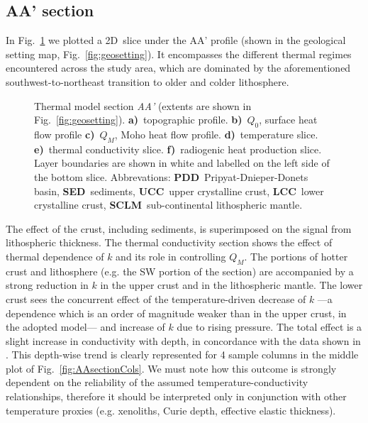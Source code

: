 {\subsection{AA' section}
\label{ss:Appl:DiscTherm:Section}

In Fig.~\ref{fig:AAsection} we plotted a 2D~slice under the AA' profile (shown in the geological setting map, Fig.~\ref{fig:geosetting}).
It encompasses the different thermal regimes encountered across the study area, which are dominated by the aforementioned southwest-to-northeast transition to older and colder lithosphere.

\begin{figure}
	\begin{adjustbox}{center}
	\end{adjustbox}
	\caption{Thermal model section \textit{AA'} (extents are shown in Fig.~\ref{fig:geosetting}).
	\textbf{a)}~topographic profile.
	\textbf{b)}~$Q_0$, surface heat flow profile
	\textbf{c)}~$Q_M$, Moho heat flow profile.
	\textbf{d)}~temperature slice.
	\textbf{e)}~thermal conductivity slice.
	\textbf{f)}~radiogenic heat production slice.
	Layer boundaries are shown in white and labelled on the left side of the bottom slice.
	Abbrevations: \textbf{PDD}~Pripyat-Dnieper-Donets basin, \textbf{SED}~sediments, \textbf{UCC}~upper crystalline crust, \textbf{LCC}~lower crystalline crust, \textbf{SCLM}~sub-continental lithospheric mantle.}
	\label{fig:AAsection}
\end{figure}

The effect of the crust, including sediments, is superimposed on the signal from lithospheric thickness.
The thermal conductivity section shows the effect of thermal dependence of $k$ and its role in controlling $Q_M$.
The portions of hotter crust and lithosphere (e.g. the SW portion of the section) are accompanied by a strong reduction in $k$ in the upper crust and in the lithospheric mantle.
The lower crust sees the concurrent effect of the temperature-driven decrease of $k$ ---a dependence which is an order of magnitude weaker than in the upper crust, in the adopted \textcite{Chapman1986} model--- and increase of $k$ due to rising pressure.
The total effect is a slight increase in conductivity with depth, in concordance with the data shown in \textcite{Chapman1986}.
This depth-wise trend is clearly represented for 4 sample columns in the middle plot of Fig.~\ref{fig:AAsectionCols}.
We must note how this outcome is strongly dependent on the reliability of the assumed temperature-conductivity relationships, therefore it should be interpreted only in conjunction with other temperature proxies (e.g. xenoliths, Curie depth, effective elastic thickness).

}
